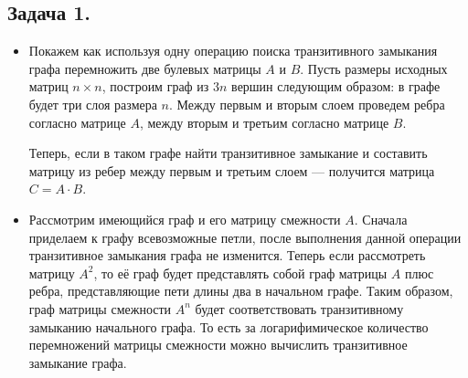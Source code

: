 \documentclass{article}
\begin{document}
\subsection*{Задача 1.}
\begin{itemize}
    \item
    Покажем как используя одну операцию поиска транзитивного замыкания
    графа перемножить две булевых матрицы $A$ и $B$. Пусть размеры исходных
    матриц $n \times n$, построим граф из $3n$ вершин следующим образом:
    в графе будет три слоя размера $n$. Между первым и вторым слоем
    проведем ребра согласно матрице $A$, между вторым и третьим согласно
    матрице $B$.

    Теперь, если в таком графе найти транзитивное замыкание и составить
    матрицу из ребер между первым и третьим слоем --- получится матрица
    $C = A \cdot B$.

    \item
    Рассмотрим имеющийся граф и его матрицу смежности $A$. Сначала приделаем
    к графу всевозможные петли, после выполнения данной операции
    транзитивное замыкания графа не изменится. Теперь если рассмотреть матрицу
    $A^2$, то её граф будет представлять собой граф матрицы $A$ плюс ребра,
    представляющие пети длины два в начальном графе. Таким образом,
    граф матрицы смежности $A^n$ будет соответствовать транзитивному
    замыканию начального графа. То есть за логарифимическое количество
    перемножений матрицы смежности можно вычислить транзитивное
    замыкание графа.
\end{itemize}
\end{document}
